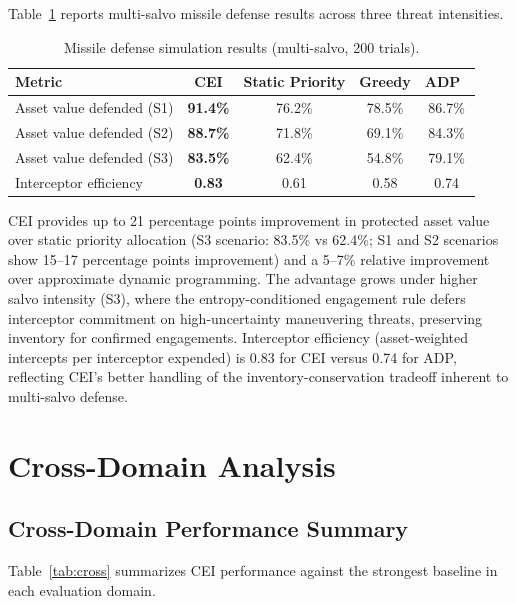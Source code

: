 \documentclass[runningheads]{llncs}
\begin{document}
Table~\ref{tab:missile} reports multi-salvo missile defense results across three threat intensities.

\begin{table}[ht]
\caption{Missile defense simulation results (multi-salvo, 200 trials).}
\label{tab:missile}
\centering
\small
\begin{tabular}{lcccc}
\toprule
Metric & \textbf{CEI} & Static Priority & Greedy & ADP~\cite{davis_adp} \\
\midrule
Asset value defended (S1) & \textbf{91.4\%} & 76.2\% & 78.5\% & 86.7\% \\
Asset value defended (S2) & \textbf{88.7\%} & 71.8\% & 69.1\% & 84.3\% \\
Asset value defended (S3) & \textbf{83.5\%} & 62.4\% & 54.8\% & 79.1\% \\
Interceptor efficiency    & \textbf{0.83}   & 0.61  & 0.58  & 0.74  \\
\bottomrule
\end{tabular}
\end{table}

CEI provides up to 21 percentage points improvement in protected asset value over static priority allocation (S3 scenario: 83.5\% vs 62.4\%; S1 and S2 scenarios show 15--17 percentage points improvement) and a 5--7\% relative improvement over approximate dynamic programming. The advantage grows under higher salvo intensity (S3), where the entropy-conditioned engagement rule defers interceptor commitment on high-uncertainty maneuvering threats, preserving inventory for confirmed engagements. Interceptor efficiency (asset-weighted intercepts per interceptor expended) is 0.83 for CEI versus 0.74 for ADP, reflecting CEI's better handling of the inventory-conservation tradeoff inherent to multi-salvo defense.

\section{Cross-Domain Analysis}
\label{sec:crossdomain}

\subsection{Cross-Domain Performance Summary}

Table~\ref{tab:cross} summarizes CEI performance against the strongest baseline in each evaluation domain.
\end{document}
